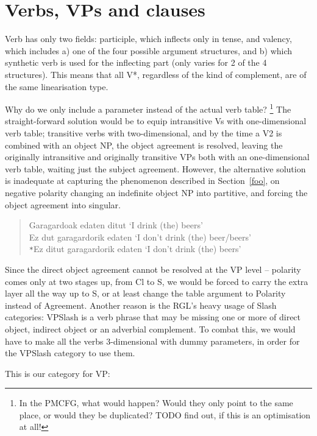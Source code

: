 \documentclass[11pt,a4paper]{article}
\begin{document}
\section{Verbs, VPs and clauses}
   Verb has only two fields: participle, which inflects only in tense, and 
   valency, which includes
   a) one of the four possible argument structures, and
   b) which synthetic verb is used for the inflecting part (only varies for 2 of the 4 structures).
   This means that all V*, regardless of the kind of complement, are of the same linearisation type.
   
   Why do we only include a parameter instead of the actual verb table?
   \footnote{In the PMCFG, what would happen? Would they only point to the same place, or would they be duplicated? TODO find out, if this is an optimisation at all!}
   The straight-forward solution would be to equip intransitive Vs with one-dimensional verb table;
   transitive verbs with two-dimensional, and by the time a V2 is combined with an object NP, the object agreement is resolved,
   leaving the originally intransitive and originally transitive VPs both with an one-dimensional verb table, waiting just the subject agreement.
   However, the alternative solution is inadequate at capturing the phenomenon described in Section~\ref{foo}, 
   on negative polarity changing an indefinite object NP into partitive, and forcing the object agreement into singular.

\begin{quote}
   Garagardoak edaten ditut   `I drink (the) beers' \\
   Ez dut garagardorik edaten `I don't drink (the) beer/beers' \\
   \verb!*!Ez ditut garagardorik edaten `I don't drink (the) beers'
\end{quote}

   Since the direct object agreement cannot be resolved at the VP level -- polarity comes only at two stages up, from Cl to S,
   we would be forced to carry the extra layer all the way up to S, or at least change the table argument to Polarity instead of Agreement.
   Another reason is the RGL's heavy usage of Slash categories: VPSlash is a verb phrase that may be missing one or more of
   direct object, indirect object or an adverbial complement.
   To combat this, we would have to make all the verbs 3-dimensional with dummy parameters, in order for the VPSlash category to use them.

   This is our category for VP:
\end{document}
